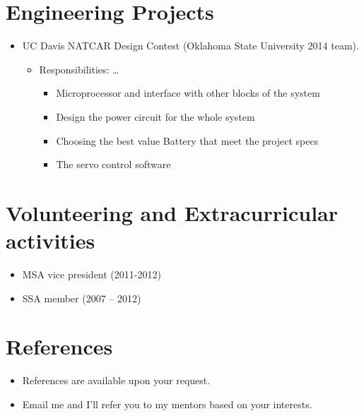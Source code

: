 \documentclass[letterpaper,10pt]{article}
\begin{document}
\chapter{Engineering Projects}
\label{sec:org014574a}

\begin{itemize}
	\item UC Davis NATCAR Design Contest (Oklahoma State University 2014 team).
	\begin{itemize}
		\item Responsibilities: \dots{}
			\begin{itemize}
				\item Microprocessor and interface with other blocks of the system
				\item Design the power circuit for the whole system
				\item Choosing the best value Battery that meet the project specs
				\item The servo control software
			\end{itemize}
\end{itemize}
\end{itemize}

\chapter{Volunteering and Extracurricular activities}
\label{sec:org30e5bf2}
\begin{itemize}
	\item MSA vice president (2011-2012)
	\item SSA member (2007 – 2012)
\end{itemize}
\chapter{References}
\label{sec:org0f51893}

\begin{itemize}
	\item References are available upon your request.
	\item Email me \href{mailto:eid.alkhaldi@gmail.com}{\email} and I'll refer you to my mentors based on your interests.
\end{itemize}
\end{document}
